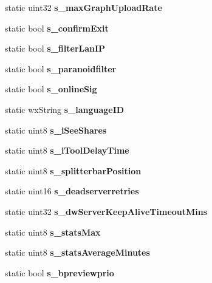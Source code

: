 \begin{DoxyCompactItemize}
\item 
static uint32 {\bfseries s\_\-maxGraphUploadRate}\label{classCPreferences_a28171a750a051c4f3cde15859e1a3d35}

\item 
static bool {\bfseries s\_\-confirmExit}\label{classCPreferences_a6ea6cae6f7e09c48ce2c0554698dedd0}

\item 
static bool {\bfseries s\_\-filterLanIP}\label{classCPreferences_a9d691f8b2b2043c29388d91b3e0a3cef}

\item 
static bool {\bfseries s\_\-paranoidfilter}\label{classCPreferences_a674caf094a340d6d935d23ab76cf8915}

\item 
static bool {\bfseries s\_\-onlineSig}\label{classCPreferences_af034fc24d8fd7ae53cc02d2f4948b430}

\item 
static wxString {\bfseries s\_\-languageID}\label{classCPreferences_a313c02337f39ad2435b9889e7106ba3c}

\item 
static uint8 {\bfseries s\_\-iSeeShares}\label{classCPreferences_a83325e3099300aa23bc1a6c872377b33}

\item 
static uint8 {\bfseries s\_\-iToolDelayTime}\label{classCPreferences_ac9e2380e2a83bf430b8d5ca35f20e12e}

\item 
static uint8 {\bfseries s\_\-splitterbarPosition}\label{classCPreferences_ad0cae902a3153b056b2e6cac6c360334}

\item 
static uint16 {\bfseries s\_\-deadserverretries}\label{classCPreferences_aa37b3e9f2eb4b9d35a35408585c9728e}

\item 
static uint32 {\bfseries s\_\-dwServerKeepAliveTimeoutMins}\label{classCPreferences_ad83604de0012f4d9450c8c4824b9e4c5}

\item 
static uint8 {\bfseries s\_\-statsMax}\label{classCPreferences_ac1521386e1b56f3ca2174bfb84c6f69c}

\item 
static uint8 {\bfseries s\_\-statsAverageMinutes}\label{classCPreferences_ae8498ebfb4cbcc56bd27d69c2a6c4f8a}

\item 
static bool {\bfseries s\_\-bpreviewprio}\label{classCPreferences_acd4e931400deecfb2ba3f281863c33b9}


\end{DoxyCompactItemize}
